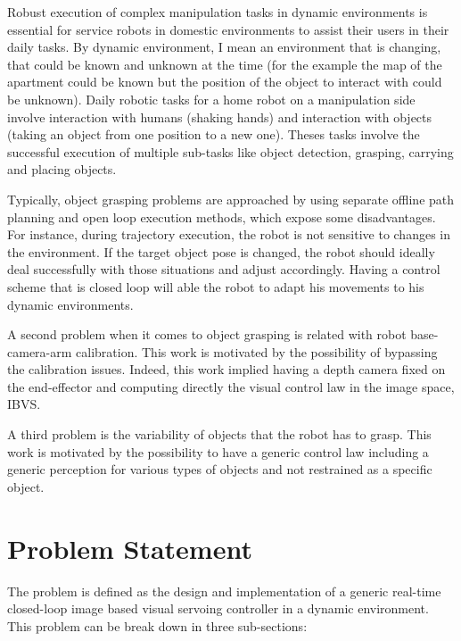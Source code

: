 Robust execution of complex manipulation tasks in dynamic environments is essential for service robots in domestic environments to assist their users in their daily tasks. By dynamic environment, I mean an environment that is changing, that could be known and unknown at the time (for the example the map of the apartment could be known but the position of the object to interact with could be unknown). Daily robotic tasks for a home robot on a manipulation side involve interaction with humans (shaking hands) and interaction with objects (taking an object from one position to a new one). Theses tasks involve the successful execution of multiple sub-tasks like object detection, grasping, carrying and placing objects.

Typically, object grasping problems are approached by using separate offline path planning and open loop execution methods, which expose some disadvantages. For instance, during trajectory execution, the robot is not sensitive to changes in the environment. If the target object pose is changed, the robot should ideally deal successfully with those situations and adjust accordingly. Having a control scheme that is closed loop will able the robot to adapt his movements to his dynamic environments.

A second problem when it comes to object grasping is related with robot base-camera-arm calibration. This work is motivated by the possibility of bypassing the calibration issues. Indeed, this work implied having a depth camera fixed on the end-effector and computing directly the visual control law in the image space, \gls{IBVS}.

A third problem is the variability of objects that the robot has to grasp. This work is motivated by the possibility to have a generic control law including a generic perception  for various types of objects and not restrained as a specific object.

\section{Problem Statement}

The problem is defined as the design and implementation of a generic real-time closed-loop image based visual servoing controller in a dynamic environment. This problem can be break down in three sub-sections: 

